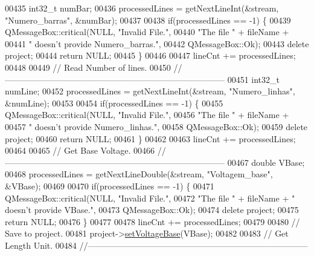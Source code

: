 \begin{DoxyCode}
00435   int32\_t numBar;
00436   processedLines = getNextLineInt(&stream, \textcolor{stringliteral}{"Numero\_barras"}, &numBar);
00437 
00438   \textcolor{keywordflow}{if}(processedLines == -1) \{
00439     QMessageBox::critical(NULL, \textcolor{stringliteral}{"Invalid File."},
00440                           \textcolor{stringliteral}{"The file "} + fileName +
00441                           \textcolor{stringliteral}{" doesn't provide Numero\_barras."},
00442                           QMessageBox::Ok);
00443     \textcolor{keyword}{delete} project;
00444     \textcolor{keywordflow}{return} NULL;
00445   \}
00446 
00447   lineCnt += processedLines;
00448 
00449 \textcolor{comment}{// Read Number of lines.}
00450 \textcolor{comment}{//------------------------------------------------------------------------------}
00451   int32\_t numLine;
00452   processedLines = getNextLineInt(&stream, \textcolor{stringliteral}{"Numero\_linhas"}, &numLine);
00453 
00454   \textcolor{keywordflow}{if}(processedLines == -1) \{
00455     QMessageBox::critical(NULL, \textcolor{stringliteral}{"Invalid File."},
00456                           \textcolor{stringliteral}{"The file "} + fileName +
00457                           \textcolor{stringliteral}{" doesn't provide Numero\_linhas."},
00458                           QMessageBox::Ok);
00459     \textcolor{keyword}{delete} project;
00460     \textcolor{keywordflow}{return} NULL;
00461   \}
00462 
00463   lineCnt += processedLines;
00464 
00465 \textcolor{comment}{// Get Base Voltage.}
00466 \textcolor{comment}{//------------------------------------------------------------------------------}
00467   \textcolor{keywordtype}{double} VBase;
00468   processedLines = getNextLineDouble(&stream, \textcolor{stringliteral}{"Voltagem\_base"}, &VBase);
00469 
00470   \textcolor{keywordflow}{if}(processedLines == -1) \{
00471     QMessageBox::critical(NULL, \textcolor{stringliteral}{"Invalid File."},
00472                           \textcolor{stringliteral}{"The file "} + fileName + \textcolor{stringliteral}{" doesn't provide VBase."},
00473                           QMessageBox::Ok);
00474     \textcolor{keyword}{delete} project;
00475     \textcolor{keywordflow}{return} NULL;
00476   \}
00477 
00478   lineCnt += processedLines;
00479 
00480 \textcolor{comment}{// Save to project.}
00481   project->\hyperlink{class_project_a494c3e89851f754188c7abaedbf77ef6}{setVoltageBase}(VBase);
00482 
00483 \textcolor{comment}{// Get Length Unit.}
00484 \textcolor{comment}{//------------------------------------------------------------------------------}

\end{DoxyCode}
